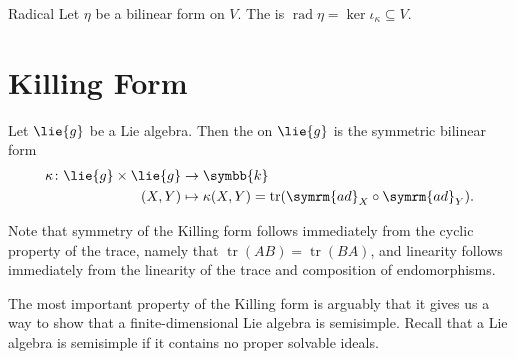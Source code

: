 \documentclass[fleqn]{NotesClass}
\renewcommand{\field}{\symbb{k}}
\DeclareMathOperator{\tr}{tr}
\newcommand{\ad}{\symrm{ad}}
\DeclareMathOperator{\rad}{rad}
\begin{document}
    \begin{dfn}{Radical}{}
        Let \(\eta\) be a bilinear form on \(V\).
        The  is \(\rad \eta = \ker \iota_\kappa \subseteq V\).
    \end{dfn}
    
    \section{Killing Form}
    \begin{dfn}{}{}
        Let \(\lie{g}\) be a Lie algebra.
        Then the  on \(\lie{g}\) is the symmetric bilinear form
        \begin{align}
            \kappa \colon \lie{g} \times \lie{g} &\to \field\\
            (X, Y) &\mapsto \kappa(X, Y) = \tr(\ad_X \circ \ad_Y).
        \end{align}
    \end{dfn}
    
    Note that symmetry of the Killing form follows immediately from the cyclic property of the trace, namely that \(\tr(AB) = \tr(BA)\), and linearity follows immediately from the linearity of the trace and composition of endomorphisms.
    
    The most important property of the Killing form is arguably that it gives us a way to show that a finite-dimensional Lie algebra is semisimple.
    Recall that a Lie algebra is semisimple if it contains no proper solvable ideals.
    
\end{document}
